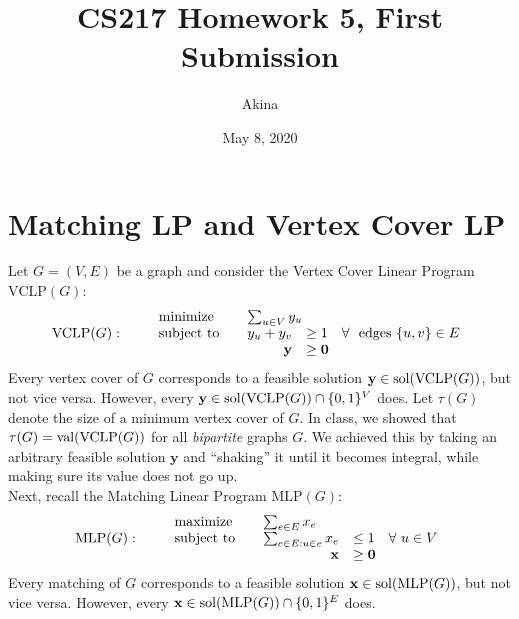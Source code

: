 \documentclass[11pt,a4paper,oneside]{article}
\newcommand{\x}{\mathbf{x}}
\newcommand{\y}{\mathbf{y}}
\newcommand{\sol}{\textup{\textrm{sol}}}
\newcommand{\val}{\textnormal{val}}
\renewcommand{\hwtitle} {CS217 Homework 5, First Submission}
\renewcommand{\hwauthor}{Akina}
\renewcommand{\hwdate}{May 8, 2020}
\begin{document}
\title{\hwtitle}
\author{\hwauthor}
\date{\hwdate}
\maketitle


\section*{Matching LP and Vertex Cover LP}



Let $G=(V,E)$ be a 
graph and consider the Vertex Cover Linear Program $\textrm{VCLP}(G)$:
\begin{align*}
\textrm{VCLP($G$)}: \qquad
\begin{array}{lrl}
\textnormal{minimize} \quad & \multicolumn{2}{l}{\sum_{u \in V} y_u} \\
\textnormal{subject to} \quad & y_u + y_v  & \geq 1 \quad \forall\ \textnormal{ edges } \{u,v\} \in E\\
& \y & \geq \mathbf{0}  
\end{array}
\end{align*}
Every vertex cover of $G$ corresponds to a feasible solution $\y \in \sol(\textrm{VCLP}(G))$, but not 
vice versa. However, every $\y \in \sol(\textrm{VCLP}(G)) \cap \{0,1\}^V$ does.
Let $\tau(G)$ denote the size of a minimum vertex cover of $G$. In class, we showed that
$\tau(G) = \val(\textrm{VCLP}(G))$ for all {\em bipartite} graphs $G$. We achieved this by taking
an arbitrary feasible solution $\y$ and ``shaking'' it until it becomes integral, while making sure
its value does not go up.\\


Next, recall the Matching Linear Program $\textrm{MLP}(G)$:
\begin{align*}
\textrm{MLP($G$)}: \qquad
\begin{array}{lrl}
\textnormal{maximize} \quad & \multicolumn{2}{l}{\sum_{e \in E} x_e} \\
\textnormal{subject to} \quad & \sum_{e \in E: u \in e} x_e  & \leq 1 \quad \forall\ u \in V \\
& \x & \geq \mathbf{0}  
\end{array}
\end{align*}
Every matching of $G$ corresponds to a feasible solution $\x \in \sol(\textrm{MLP}(G))$, but not 
vice versa. However, every $\x \in \sol(\textrm{MLP}(G)) \cap \{0,1\}^E$ does.
\end{document}
